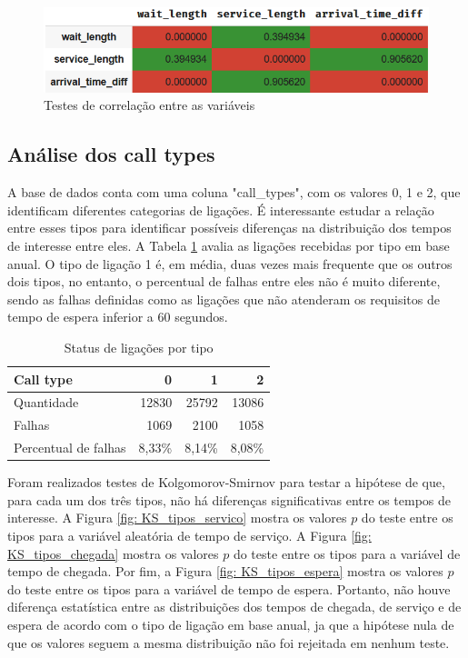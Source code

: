 \begin{figure}[H]
    \includegraphics{analise-de-dados/anual/spearman-test.png}
    \caption{Testes de correlação entre as variáveis}
    \label{fig: spearman-test-1}
\end{figure}

\subsection{Análise dos call types}
A base de dados conta com uma coluna "call\_types", com os valores 0, 1 e 2, que identificam diferentes categorias de ligações. É interessante estudar a relação entre esses tipos para identificar possíveis diferenças na distribuição dos tempos de interesse entre eles. A Tabela \ref*{tab: call-type} avalia as ligações recebidas por tipo em base anual. O tipo de ligação 1 é, em média, duas vezes mais frequente que os outros dois tipos, no entanto, o percentual de falhas entre eles não é muito diferente, sendo as falhas definidas como as ligações que não atenderam os requisitos de tempo de espera inferior a 60 segundos.

\begin{table}[H]
    \centering
    \begin{tabular}{|l|r|r|r|}
    \hline
    \textbf{Call type} & 0 & 1 & 2 \\ \hline
    Quantidade & 12830 & 25792 & 13086 \\ \hline
    Falhas & 1069 & 2100 & 1058 \\ \hline
    Percentual de falhas & 8,33\% & 8,14\% & 8,08\% \\ \hline
    \end{tabular}
    \caption{Status de ligações por tipo}
    \label{tab: call-type}
\end{table}
    
Foram realizados testes de Kolgomorov-Smirnov para testar a hipótese de que, para cada um dos três tipos, não há diferenças significativas entre os tempos de interesse. A Figura \ref*{fig: KS_tipos_servico} mostra os valores $p$ do teste entre os tipos para a variável aleatória de tempo de serviço. A Figura \ref*{fig: KS_tipos_chegada} mostra os valores $p$ do teste entre os tipos para a variável de tempo de chegada. Por fim, a Figura \ref*{fig: KS_tipos_espera} mostra os valores $p$ do teste entre os tipos para a variável de tempo de espera. Portanto, não houve diferença estatística entre as distribuições dos tempos de chegada, de serviço e de espera de acordo com o tipo de ligação em base anual, ja que a hipótese nula de que os valores seguem a mesma distribuição não foi rejeitada em nenhum teste.

